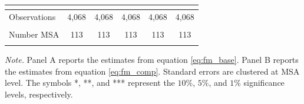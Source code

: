 \documentclass[dv_diss_main.tex]{subfiles}
\begin{document}
\begin{table}[H]
\begin{center}
{\begin{tabular}{lccccc}
    \vspace{4pt} & \begin{footnotesize}\end{footnotesize} & \begin{footnotesize}\end{footnotesize} & \begin{footnotesize}\end{footnotesize} & \begin{footnotesize}\end{footnotesize} & \begin{footnotesize}\end{footnotesize} \\
    \hline
    Observations & 4,068 & 4,068 & 4,068 & 4,068 & 4,068 \\
    \vspace{-2pt} & \vspace{-2pt} & \vspace{-2pt} & \vspace{-2pt} & \vspace{-2pt} \\
    Number MSA & 113 & 113 & 113 & 113 & 113 \\
    \vspace{-2pt} & \vspace{-2pt} & \vspace{-2pt} & \vspace{-2pt} & \vspace{-2pt} \\
    \hline
    
    \end{tabular}
    }
    
    \end{center}
       
    \footnotesize{\textit{Note. }Panel A reports the estimates from equation \eqref{eq:fm_base}. Panel B reports the estimates from equation \eqref{eq:fm_comp}. Standard errors are clustered at MSA level. The symbols *, **, and *** represent the $10\%$, $5\%$, and $1\%$ significance levels, respectively.}
\end{table}
\end{document}
